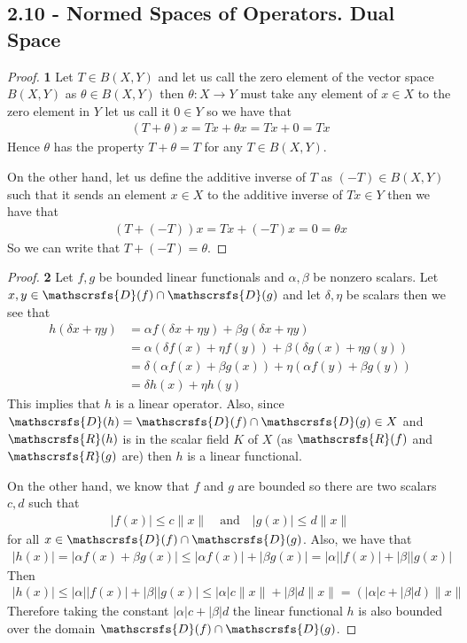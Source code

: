 \documentclass[11pt]{article}
\newcommand{\dom}{\mathscrsfs{D}}
\newcommand{\range}{\mathscrsfs{R}}
\theoremstyle{definition}
\begin{document}
\subsection*{2.10 - Normed Spaces of Operators. Dual Space}
\begin{proof}{\textbf{1}}
    Let $T \in B(X,Y)$ and let us call the zero element of the vector space
    $B(X,Y)$ as $\theta \in B(X,Y)$ then $\theta:X \to Y$ must take any element
    of $x \in X$ to the zero element in $Y$ let us call it $0 \in Y$ so
    we have that
    \begin{align*}
        (T + \theta)x = Tx + \theta x = Tx + 0 = Tx
    \end{align*}
    Hence $\theta$ has the property $T + \theta = T$ for any $T \in B(X,Y)$.

    On the other hand, let us define the additive inverse of $T$ as
    $(-T)\in B(X,Y)$ such that it sends an element $x\in X$ to the additive
    inverse of $Tx \in Y$ then we have that
    \begin{align*}
        (T + (-T))x = Tx + (-T)x = 0 = \theta x
    \end{align*}
    So we can write that $T + (-T) = \theta$.
\end{proof}
\begin{proof}{\textbf{2}}
    Let $f,g$ be bounded linear functionals and $\alpha, \beta$ be nonzero
    scalars. Let $x,y \in \dom(f) \cap \dom(g)$ and let $\delta, \eta$ be
    scalars then we see that
    \begin{align*}
        h(\delta x + \eta y)
        &= \alpha f(\delta x + \eta y) + \beta g(\delta x + \eta y)\\
        &= \alpha (\delta f(x) + \eta f(y)) + \beta (\delta g(x) + \eta g(y))\\
        &= \delta (\alpha f(x) + \beta g(x)) + \eta (\alpha f(y) + \beta g(y))\\
        &= \delta h(x) + \eta h(y)
    \end{align*}
    This implies that $h$ is a linear operator.
    Also, since $\dom(h) = \dom(f) \cap \dom(g) \in X$ and $\range(h)$ is in
    the scalar field $K$ of $X$ (as $\range(f)$ and $\range(g)$ are)
    then $h$ is a linear functional.

    On the other hand, we know that $f$ and $g$ are bounded so there are two
    scalars $c,d$ such that
    \begin{align*}
        |f(x)| \leq c\|x\| \quad\text{and}\quad |g(x)| \leq d\|x\|
    \end{align*}
    for all $x \in \dom(f) \cap \dom(g)$. Also, we have that
    \begin{align*}
        |h(x)| = |\alpha f(x) + \beta g(x)|
        \leq |\alpha f(x)| + |\beta g(x)| = |\alpha||f(x)| + |\beta||g(x)|
    \end{align*}
    Then
    \begin{align*}
        |h(x)| \leq |\alpha||f(x)| + |\beta||g(x)|
        \leq |\alpha|c\|x\| + |\beta|d\|x\| = (|\alpha|c + |\beta|d)\|x\| 
    \end{align*}
    Therefore taking the constant $|\alpha|c + |\beta|d$ the linear functional
    $h$ is also bounded over the domain $\dom(f) \cap \dom(g)$.
\end{proof}
\end{document}
